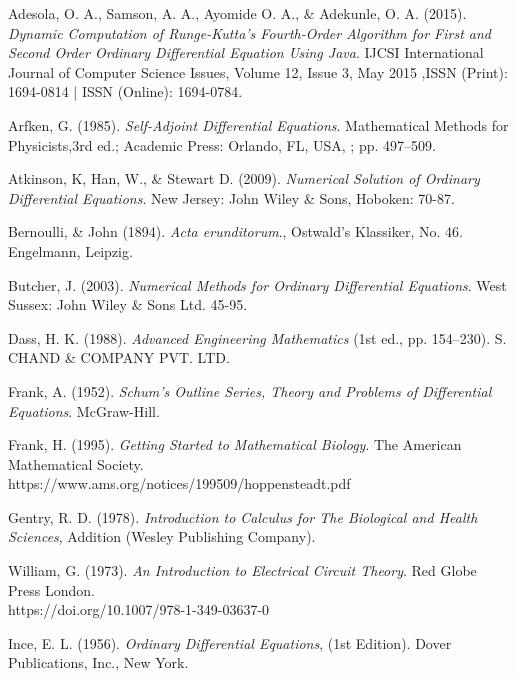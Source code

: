 \documentclass[11pt]{report}
\begin{document}
	\begin{description}
		\item Adesola, O. A., Samson, A. A., Ayomide O. A., \& Adekunle, O. A. (2015). \emph{Dynamic Computation of Runge-Kutta’s Fourth-Order Algorithm for
		First and Second Order Ordinary Differential Equation Using Java}. IJCSI International Journal of Computer Science Issues, Volume 12, Issue 3, May 2015 ,ISSN (Print): 1694-0814 | ISSN (Online): 1694-0784.
		
		\item Arfken, G. (1985). \emph{Self-Adjoint Differential Equations}. Mathematical Methods for Physicists,3rd ed.; Academic Press: Orlando, FL, USA, ; pp. 497–509.
		
		\item Atkinson, K, Han, W., \& Stewart D. (2009). \emph{Numerical Solution of Ordinary Differential Equations}. New Jersey: John Wiley \& Sons, Hoboken: 70-87.
		
		\item Bernoulli, \& John (1894). \emph{Acta erunditorum}., Ostwald's Klassiker, No. 46. Engelmann,
		Leipzig.
		
		\item Butcher, J. (2003). \emph{Numerical Methods for Ordinary Differential Equations}. West Sussex:
		John Wiley \& Sons Ltd. 45-95.
		
		\item Dass, H. K. (1988). \emph{Advanced Engineering Mathematics} (1st ed., pp. 154–230). S. CHAND \& COMPANY PVT. LTD.
		
		\item Frank, A. (1952). \emph{Schum's Outline Series, Theory and Problems of Differential Equations}. McGraw-Hill.
		
		\item Frank, H. (1995). \emph{Getting Started to Mathematical Biology}. The American Mathematical Society. \\ https://www.ams.org/notices/199509/hoppensteadt.pdf
		
		\item Gentry, R. D. (1978). \emph{Introduction to Calculus for The Biological and Health Sciences}, Addition (Wesley Publishing Company).
		
		\item William, G. (1973). \emph{An Introduction to Electrical Circuit Theory}. Red Globe Press London.
		\\https://doi.org/10.1007/978-1-349-03637-0
		
		\item Ince, E. L. (1956). \emph{Ordinary Differential Equations}, (1st Edition). Dover Publications, Inc., New York.
		

\end{description}
\end{document}
